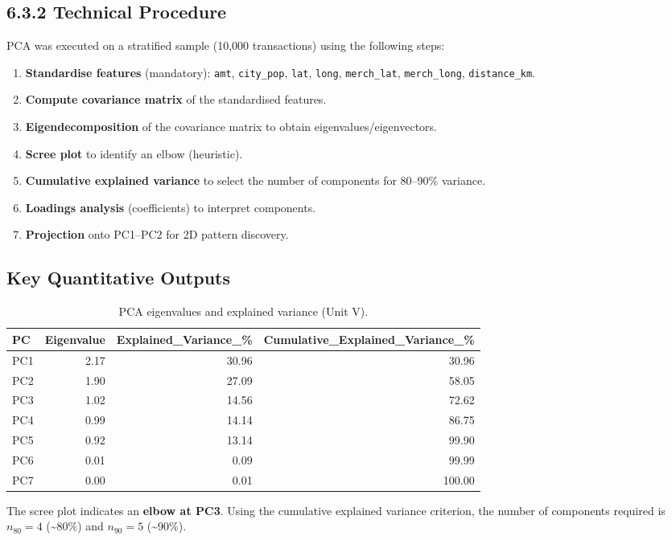 \documentclass[12pt,a4paper]{report}
\begin{document}
\subsection{6.3.2 Technical Procedure}
PCA was executed on a stratified sample (10{,}000 transactions) using the following steps:
\begin{enumerate}
  \item \textbf{Standardise features} (mandatory): \texttt{amt}, \texttt{city\_pop}, \texttt{lat}, \texttt{long}, \texttt{merch\_lat}, \texttt{merch\_long}, \texttt{distance\_km}.
  \item \textbf{Compute covariance matrix} of the standardised features.
  \item \textbf{Eigendecomposition} of the covariance matrix to obtain eigenvalues/eigenvectors.
  \item \textbf{Scree plot} to identify an elbow (heuristic).
  \item \textbf{Cumulative explained variance} to select the number of components for 80--90\% variance.
  \item \textbf{Loadings analysis} (coefficients) to interpret components.
  \item \textbf{Projection} onto PC1--PC2 for 2D pattern discovery.
\end{enumerate}

\subsection{Key Quantitative Outputs}
\begin{table}[H]
\centering
\caption{PCA eigenvalues and explained variance (Unit V).}
\begin{tabular}{lrrr}
\toprule
PC & Eigenvalue & Explained\_Variance\_\% & Cumulative\_Explained\_Variance\_\% \\
\midrule
PC1 & 2.17 & 30.96 & 30.96 \\
PC2 & 1.90 & 27.09 & 58.05 \\
PC3 & 1.02 & 14.56 & 72.62 \\
PC4 & 0.99 & 14.14 & 86.75 \\
PC5 & 0.92 & 13.14 & 99.90 \\
PC6 & 0.01 & 0.09 & 99.99 \\
PC7 & 0.00 & 0.01 & 100.00 \\
\bottomrule
\end{tabular}
\end{table}

The scree plot indicates an \textbf{elbow at PC3}. Using the cumulative explained variance criterion, the number of components required is \textbf{$n_{80}=4$} (\textasciitilde80\%) and \textbf{$n_{90}=5$} (\textasciitilde90\%).
\end{document}
